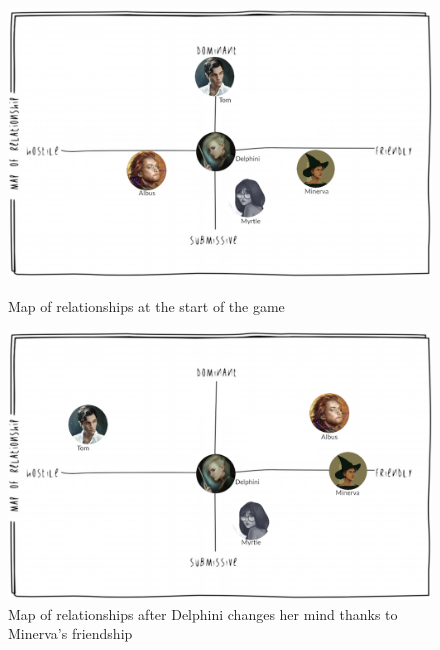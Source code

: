 \begin{figure}[H]
\includegraphics[max width=\textwidth]{../Pictures/Characters/Relationship_maps/Delphini_relmap.png} 
\captionsetup{labelformat=empty}
\caption{Map of relationships at the start of the game}
\includegraphics[max width=\textwidth]{../Pictures/Characters/Relationship_maps/Delphini_after_event_relmap.png} 
\captionsetup{labelformat=empty}
\caption{Map of relationships after Delphini changes her mind thanks to Minerva's friendship}
\end{figure}

\clearpage